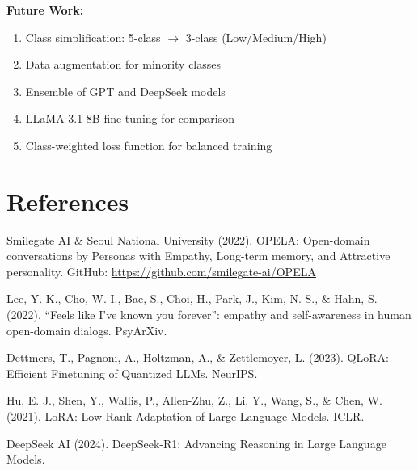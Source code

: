 \documentclass[11pt, a4paper]{article}
\begin{document}
\textbf{Future Work:}
\begin{enumerate}
    \item Class simplification: 5-class $\rightarrow$ 3-class (Low/Medium/High)
    \item Data augmentation for minority classes
    \item Ensemble of GPT and DeepSeek models
    \item LLaMA 3.1 8B fine-tuning for comparison
    \item Class-weighted loss function for balanced training
\end{enumerate}

\section*{References}

Smilegate AI \& Seoul National University (2022). OPELA: Open-domain conversations by Personas with Empathy, Long-term memory, and Attractive personality. GitHub: \url{https://github.com/smilegate-ai/OPELA}

Lee, Y. K., Cho, W. I., Bae, S., Choi, H., Park, J., Kim, N. S., \& Hahn, S. (2022). ``Feels like I've known you forever'': empathy and self-awareness in human open-domain dialogs. PsyArXiv.

Dettmers, T., Pagnoni, A., Holtzman, A., \& Zettlemoyer, L. (2023). QLoRA: Efficient Finetuning of Quantized LLMs. NeurIPS.

Hu, E. J., Shen, Y., Wallis, P., Allen-Zhu, Z., Li, Y., Wang, S., \& Chen, W. (2021). LoRA: Low-Rank Adaptation of Large Language Models. ICLR.

DeepSeek AI (2024). DeepSeek-R1: Advancing Reasoning in Large Language Models.
\end{document}

